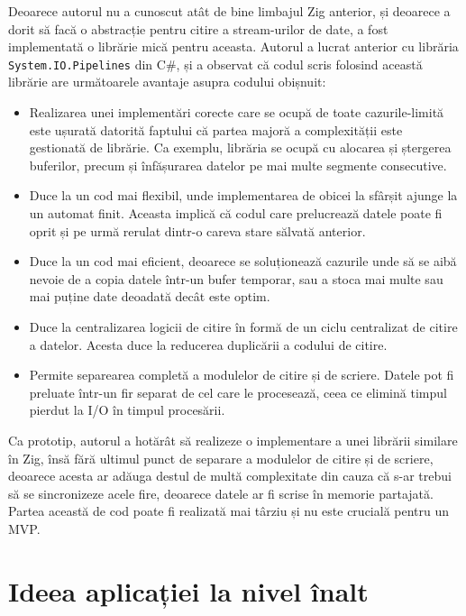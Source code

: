 \documentclass[a4paper,12pt]{report}
\begin{document}
Deoarece autorul nu a cunoscut atât de bine limbajul Zig anterior,
și deoarece a dorit să facă o abstracție pentru citire a stream-urilor de date,
a fost implementată o librărie mică pentru aceasta.
Autorul a lucrat anterior cu librăria \texttt{System.IO.Pipelines}\cite{system_io_pipelines} din C\#,
și a observat că codul scris folosind această librărie are următoarele avantaje 
asupra codului obișnuit:
\begin{itemize}
  \item 
    Realizarea unei implementări corecte care se ocupă de toate cazurile-limită 
    este ușurată datorită faptului că partea majoră a complexității este gestionată de librărie.
    Ca exemplu, librăria se ocupă cu alocarea și ștergerea buferilor,
    precum și înfășurarea datelor pe mai multe segmente consecutive.

  \item 
    Duce la un cod mai flexibil, unde implementarea de obicei la sfârșit ajunge 
    la un automat finit.
    Aceasta implică că codul care prelucrează datele poate
    fi oprit și pe urmă rerulat dintr-o careva stare sălvată anterior.

  \item
    Duce la un cod mai eficient, deoarece se soluționează cazurile unde să se aibă nevoie de
    a copia datele într-un bufer temporar, sau a stoca mai multe sau mai puține date deoadată
    decât este optim.

  \item
    Duce la centralizarea logicii de citire în formă de un ciclu centralizat de citire a datelor.
    Acesta duce la reducerea duplicării a codului de citire.

  \item
    Permite separearea completă a modulelor de citire și de scriere.
    Datele pot fi preluate într-un fir separat de cel care le procesează,
    ceea ce elimină timpul pierdut la \ac{I/O} în timpul procesării.
\end{itemize}
    
Ca prototip, autorul a hotărât să realizeze o implementare a unei librării similare în Zig,
însă fără ultimul punct de separare a modulelor de citire și de scriere,
deoarece acesta ar adăuga destul de multă complexitate din cauza că s-ar trebui
să se sincronizeze acele fire, deoarece datele ar fi scrise în memorie partajată.
Partea această de cod poate fi realizată mai târziu și nu este crucială pentru un \ac{MVP}.


\section{Ideea aplicației la nivel înalt}
\end{document}
